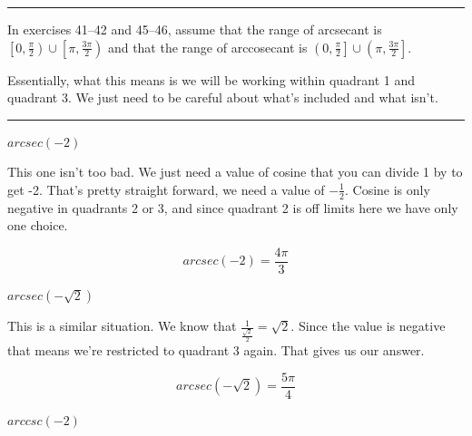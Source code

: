 \documentclass[10pt,letterpaper]{amspset}
\begin{document}
\hrule \medskip

In exercises 41--42 and 45--46, assume that the range of arcsecant is $\left[ 0 , \frac{\pi}{2} \right) \cup \left[ \pi , \frac{3\pi}{2} \right)$ and that the range of arccosecant is $\left( 0 , \frac{\pi}{2} \right] \cup \left( \pi , \frac{3\pi}{2} \right]$.

\medskip

Essentially, what this means is we will be working within quadrant 1 and quadrant 3. We just need to be careful about what's included and what isn't.
\medskip


\medskip
\hrule


\begin{problem}[41]
    $arcsec(-2)$
\end{problem}

\begin{solution}
    This one isn't too bad. We just need a value of cosine that you can divide 1 by to get -2. That's pretty straight forward, we need a value of $-\frac{1}{2}$. Cosine is only negative in quadrants 2 or 3, and since quadrant 2 is off limits here we have only one choice. 
    
    \[\boxed{  arcsec(-2) = \frac{4\pi}{3}  }\]
\end{solution}


\begin{problem}[42]
    $arcsec(-\sqrt{2})$
\end{problem}

\begin{solution}
    This is a similar situation. We know that $\frac{1}{ \frac{\sqrt{2}}{2} } = \sqrt{2}$. Since the value is negative that means we're restricted to quadrant 3 again. That gives us our answer. 
    
    \[\boxed{ arcsec(-\sqrt{2}) = \frac{5\pi}{4}  }\]
\end{solution}


\pagebreak


\begin{problem}[45]
    $arccsc(-2)$
\end{problem}
\end{document}
